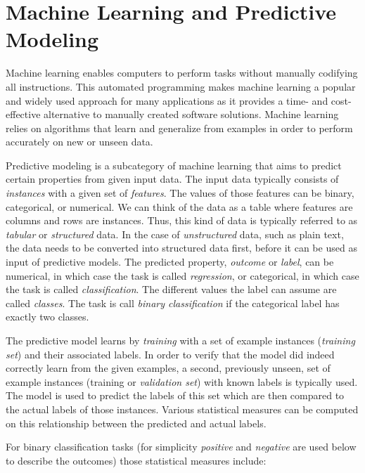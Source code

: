 \section{Machine Learning and Predictive Modeling}
Machine learning enables computers to perform tasks without manually codifying all instructions.
This automated programming makes machine learning a popular and widely used approach for many applications as it provides a time- and cost-effective alternative to manually created software solutions.
Machine learning relies on algorithms that learn and generalize from examples in order to perform accurately on new or unseen data.

Predictive modeling is a subcategory of machine learning that aims to predict certain properties from given input data.
The input data typically consists of \emph{instances} with a given set of \emph{features}.
The values of those features can be binary, categorical, or numerical.
We can think of the data as a table where features are columns and rows are instances.
Thus, this kind of data is typically referred to as \emph{tabular} or \emph{structured} data.
In the case of \emph{unstructured} data, such as plain text, the data needs to be converted into structured data first, before it can be used as input of predictive models.
The predicted property, \emph{outcome} or \emph{label}, can be numerical, in which case the task is called \emph{regression}, or categorical, in which case the task is called \emph{classification}.
The different values the label can assume are called \emph{classes}.
The task is call \emph{binary classification} if the categorical label has exactly two classes.

The predictive model learns by \emph{training} with a set of example instances (\emph{training set}) and their associated labels.
In order to verify that the model did indeed correctly learn from the given examples, a second, previously unseen, set of example instances (training or \emph{validation set}) with known labels is typically used.
The model is used to predict the labels of this set which are then compared to the actual labels of those instances.
Various statistical measures can be computed on this relationship between the predicted and actual labels.

For binary classification tasks (for simplicity \emph{positive} and \emph{negative} are used below to describe the outcomes) those statistical measures include:

